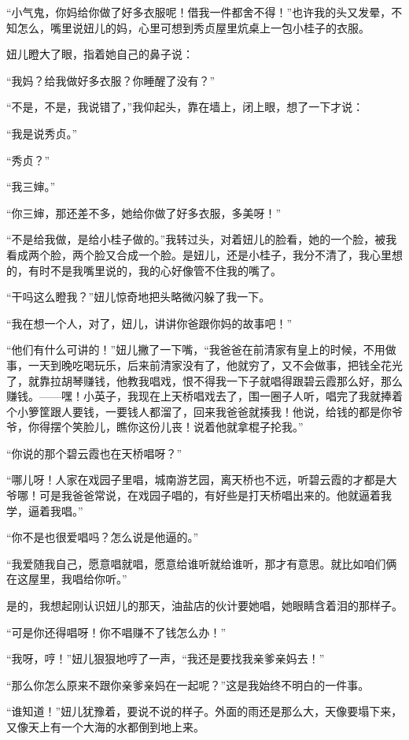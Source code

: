 \par “小气鬼，你妈给你做了好多衣服呢！借我一件都舍不得！”也许我的头又发晕，不知怎么，嘴里说妞儿的妈，心里可想到秀贞屋里炕桌上一包小桂子的衣服。
\par 妞儿瞪大了眼，指着她自己的鼻子说：
\par “我妈？给我做好多衣服？你睡醒了没有？”
\par “不是，不是，我说错了，”我仰起头，靠在墙上，闭上眼，想了一下才说：
\par “我是说秀贞。”
\par “秀贞？”
\par “我三婶。”
\par “你三婶，那还差不多，她给你做了好多衣服，多美呀！”
\par “不是给我做，是给小桂子做的。”我转过头，对着妞儿的脸看，她的一个脸，被我看成两个脸，两个脸又合成一个脸。是妞儿，还是小桂子，我分不清了，我心里想的，有时不是我嘴里说的，我的心好像管不住我的嘴了。
\par “干吗这么瞪我？”妞儿惊奇地把头略微闪躲了我一下。
\par “我在想一个人，对了，妞儿，讲讲你爸跟你妈的故事吧！”
\par “他们有什么可讲的！”妞儿撇了一下嘴，“我爸爸在前清家有皇上的时候，不用做事，一天到晚吃喝玩乐，后来前清家没有了，他就穷了，又不会做事，把钱全花光了，就靠拉胡琴赚钱，他教我唱戏，恨不得我一下子就唱得跟碧云霞那么好，那么赚钱。——嘿！小英子，我现在上天桥唱戏去了，围一圈子人听，唱完了我就捧着个小箩筐跟人要钱，一要钱人都溜了，回来我爸爸就揍我！他说，给钱的都是你爷爷，你得摆个笑脸儿，瞧你这份儿丧！说着他就拿棍子抡我。”
\par “你说的那个碧云霞也在天桥唱呀？”
\par “哪儿呀！人家在戏园子里唱，城南游艺园，离天桥也不远，听碧云霞的才都是大爷哪！可是我爸爸常说，在戏园子唱的，有好些是打天桥唱出来的。他就逼着我学，逼着我唱。”
\par “你不是也很爱唱吗？怎么说是他逼的。”
\par “我爱随我自己，愿意唱就唱，愿意给谁听就给谁听，那才有意思。就比如咱们俩在这屋里，我唱给你听。”
\par 是的，我想起刚认识妞儿的那天，油盐店的伙计要她唱，她眼睛含着泪的那样子。
\par “可是你还得唱呀！你不唱赚不了钱怎么办！”
\par “我呀，哼！”妞儿狠狠地哼了一声，“我还是要找我亲爹亲妈去！”
\par “那么你怎么原来不跟你亲爹亲妈在一起呢？”这是我始终不明白的一件事。
\par “谁知道！”妞儿犹豫着，要说不说的样子。外面的雨还是那么大，天像要塌下来，又像天上有一个大海的水都倒到地上来。
